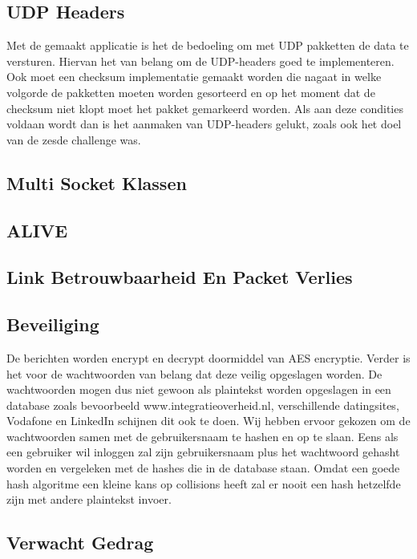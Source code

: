 \documentclass[12pt]{article}
\begin{document}
\subsection{UDP Headers}
Met de gemaakt applicatie is het de bedoeling om met UDP pakketten de data te versturen. Hiervan het van belang om de UDP-headers goed te implementeren. Ook moet een checksum implementatie gemaakt worden die nagaat in welke volgorde de pakketten moeten worden gesorteerd en op het moment dat de checksum niet klopt moet het pakket gemarkeerd worden. Als aan deze condities voldaan wordt dan is het aanmaken van UDP-headers gelukt, zoals ook het doel van de zesde challenge was. 

\subsection{Multi Socket Klassen}


\subsection{ALIVE}


\subsection{Link Betrouwbaarheid En Packet Verlies}


\subsection{Beveiliging}
De berichten worden encrypt en decrypt doormiddel van AES encryptie. Verder is het voor de wachtwoorden van belang dat deze veilig opgeslagen worden. De wachtwoorden mogen dus niet gewoon als plaintekst worden opgeslagen in een database zoals bevoorbeeld www.integratieoverheid.nl, verschillende datingsites, Vodafone en LinkedIn schijnen dit ook te doen. Wij hebben ervoor gekozen om de wachtwoorden samen met de gebruikersnaam te hashen en op te slaan. Eens als een gebruiker wil inloggen zal zijn gebruikersnaam plus het wachtwoord gehasht worden en vergeleken met de hashes die in de database staan. Omdat een goede hash algoritme een kleine kans op collisions heeft zal er nooit een hash hetzelfde zijn met andere plaintekst invoer.

\subsection{Verwacht Gedrag}
\end{document}
